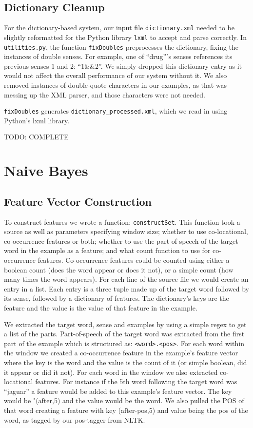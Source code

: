 \documentclass{article}
\begin{document}
\subsection{Dictionary Cleanup}
For the dictionary-based system, our input file \texttt{dictionary.xml} needed to be slightly reformatted for the Python library \texttt{lxml} to accept and parse correctly. In \texttt{utilities.py}, the function \texttt{fixDoubles} preprocesses the dictionary, fixing the instances of double senses. For example, one of ``drug'''s senses references its previous senses 1 and 2: ``1\&\&2''. We simply dropped this dictionary entry as it would not affect the overall performance of our system without it. We also removed instances of double-quote characters in our examples, as that was messing up the XML parser, and those characters were not needed.

\texttt{fixDoubles} generates \texttt{dictionary\_processed.xml}, which we read in using Python's lxml library.

TODO: COMPLETE

\section{Naive Bayes}

\subsection{Feature Vector Construction}

To construct features we wrote a function: \texttt{constructSet}. This function took a source as well as parameters specifying window size; whether to use co-locational, co-occurrence features or both; whether to use the part of speech of the target word in the example as a feature; and what count function to use for co-occurrence features. Co-occurrence features could be counted using either a boolean count (does the word appear or does it not), or a simple count (how many times the word appears). For each line of the source file we would create an entry in a list. Each entry is a three tuple made up of the target word followed by its sense, followed by a dictionary of features. The dictionary's keys are the feature and the value is the value of that feature in the example. 

We extracted the target word, sense and examples by using a simple regex to get a list of the parts. Part-of-speech of the target word was extracted from the first part of the example which is structured as: \texttt{<word>.<pos>}. For each word within the window we created a co-occurrence feature in the example's feature vector where the key is the word and the value is the count of it (or simple boolean, did it appear or did it not). For each word in the window we also extracted co-locational features. For instance if the 5th word following the target word was ``jaguar'' a feature would be added to this example's feature vector. The key would be "(after,5) and the value would be the word. We also pulled the POS of that word creating a feature with key (after-pos,5) and value being the pos of the word, as tagged by our pos-tagger from NLTK.
\end{document}
